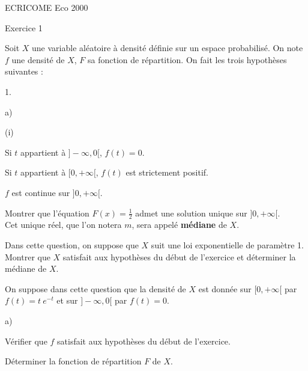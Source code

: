 \documentclass[11pt]{article}%
\begin{document}
\begin{center}
{\Huge ECRICOME Eco 2000}
\end{center}

\begin{center}
{\LARGE Exercice 1}
\end{center}

\noindent Soit $X$ une variable aléatoire à densité définie sur un
espace probabilisé. On note $f$ une densité de $X$, $F$ sa fonction de
répartition. On fait les trois hypothèses
suivantes :

\begin{noliste}{1.}
 \setlength{\itemsep}{4mm}
\item 
\begin{noliste}{a)}
 \setlength{\itemsep}{2mm}
\item 
\begin{nonoliste}{(i)}
\item Si $t$ appartient à $]-\infty,0[$, $f(t) = 0$.

\item Si $t$ appartient à $[0, + \infty [$, $f(t)$ est strictement
positif.

\item $f$ est continue sur $]0, + \infty [$.
\end{nonoliste}
\end{noliste}

\item Montrer que l'équation $F(x) =  {\frac{1}{2}}$ admet
une solution unique sur $]0, + \infty [$.\\
Cet unique réel, que l'on notera $m$, sera appelé \textbf{médiane} de
$X$.

\item Dans cette question, on suppose que $X$ suit une loi
exponentielle de
paramètre 1.\\
Montrer que $X$ satisfait aux hypothèses du début de l'exercice et
déterminer la médiane de $X$.

\item On suppose dans cette question que la densité de $X$ est donnée
sur $[0, + \infty [$ par $f(t) = t\ e^{-t}$ et sur $]-\infty,0[$ par
$f(t) = 0$.

\begin{noliste}{a)}
 \setlength{\itemsep}{2mm}
\item Vérifier que $f$ satisfait aux hypothèses du début de
l'exercice.

\item Déterminer la fonction de répartition $F$ de $X$.


\end{noliste}
\end{noliste}
\end{document}

